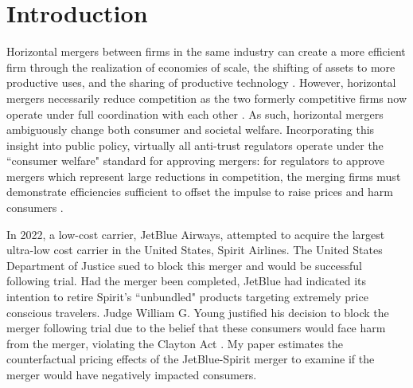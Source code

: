 \documentclass{article}
\begin{document}
    \section{Introduction}
    Horizontal mergers between firms in the same industry can create a more efficient firm through the realization of economies of scale, the shifting of assets to more productive uses, and the sharing of productive technology \citep{williamson_economies_1968, farrell_horizontal_1990, kaplow_improving_2025}. However, horizontal mergers necessarily reduce competition as the two formerly competitive firms now operate under full coordination with each other \citep{stigler_theory_1964}. As such, horizontal mergers ambiguously change both consumer and societal welfare. Incorporating this insight into public policy, virtually all anti-trust regulators operate under the  ``consumer welfare" standard for approving mergers: for regulators to approve mergers which represent large reductions in competition, the merging firms must demonstrate efficiencies sufficient to offset the impulse to raise prices and harm consumers \citep{whinston_chapter_2007}. %

    In 2022, a low-cost carrier, JetBlue Airways, attempted to acquire the largest ultra-low cost carrier in the United States, Spirit Airlines. The United States Department of Justice sued to block this merger and would be successful following trial. Had the merger been completed, JetBlue had indicated its intention to retire Spirit's ``unbundled" products targeting extremely price conscious travelers.  Judge William G. Young justified his decision to block the merger following trial due to the belief that these consumers would face harm from the merger, violating the Clayton Act \citep{william_g_young_findings_2024}.  My paper estimates the counterfactual pricing effects of the JetBlue-Spirit merger to examine if the merger would have negatively impacted consumers. 
\end{document}
